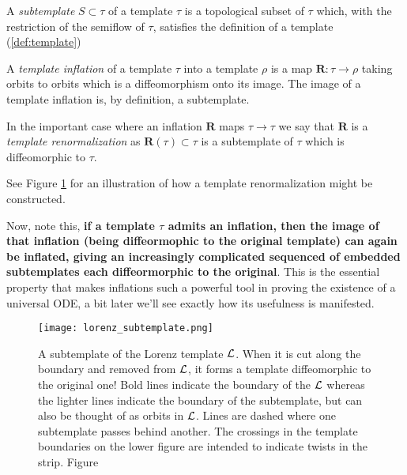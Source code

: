 \documentclass[main.tex]{subfiles}
\begin{document}
\begin{definition}[Subtemplate]

  A \emph{subtemplate} $S \subset \tau$ of a template $\tau$ is a topological subset of $\tau$ which, with the restriction of the semiflow of $\tau$, satisfies the definition of a template (\ref{def:template})
\end{definition}


\begin{definition}

  A  \emph{template inflation} of a template $\tau$ into a template $\rho$ is a map $\bm{R} : \tau \to \rho$ taking orbits to orbits which is a diffeomorphism onto its image.
  The image of a template inflation is, by definition, a subtemplate.
\end{definition}


\begin{definition}

  In the important case where an inflation $\bm{R}$ maps $\tau \to \tau$ we say that $\bm{R}$ is a \emph{template renormalization} as $\bm{R}(\tau) \subset \tau$ is a subtemplate of $\tau$ which
  is diffeomorphic to $\tau$.
\end{definition}


See Figure \ref{fig:lorenz_subtemplate} for an illustration of how a template renormalization might be constructed.


Now, note this, \textbf{if a template $\tau$ admits an inflation, then the image of that inflation (being diffeormophic to the original template) can again be inflated, giving an increasingly complicated sequenced of embedded subtemplates each diffeormorphic to the original}. This is the essential property that makes inflations such a powerful tool in proving the existence of a universal ODE, a bit later
we'll see exactly how its usefulness is manifested.

\begin{figure}[h]
  \centering
  \texttt{[image: lorenz\_subtemplate.png]}
  \caption{A subtemplate of the Lorenz template $\mathcal{L}$. When it is cut along the boundary and removed from $\mathcal{L}$, it forms a template diffeomorphic to the original one!
    Bold lines indicate the boundary of the $\mathcal{L}$ whereas the lighter lines indicate the boundary of the subtemplate, but can also be thought of as orbits in $\mathcal{L}$.
    Lines are dashed where one subtemplate passes behind another. The crossings in the template boundaries on the lower figure
    are intended to indicate twists in the strip.
    Figure \cite{knottyode}}\label{fig:lorenz_subtemplate}
\end{figure}
\\
\end{document}
